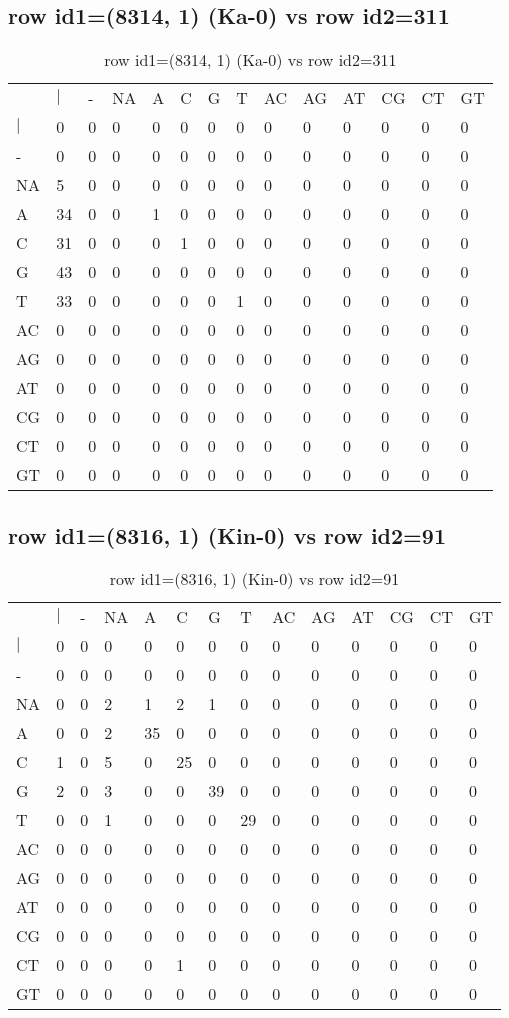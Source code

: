 \subsection{row id1=(8314, 1) (Ka-0) vs row id2=311}
\begin{center}
\begin{longtable}{|l|l|l|l|l|l|l|l|l|l|l|l|l|l|}
\caption{row id1=(8314, 1) (Ka-0) vs row id2=311} \label{table_dm498}\\
\hline
\\
\hline
&$|$&-&NA&A&C&G&T&AC&AG&AT&CG&CT&GT\\
$|$&0&0&0&0&0&0&0&0&0&0&0&0&0\\
-&0&0&0&0&0&0&0&0&0&0&0&0&0\\
NA&5&0&0&0&0&0&0&0&0&0&0&0&0\\
A&34&0&0&1&0&0&0&0&0&0&0&0&0\\
C&31&0&0&0&1&0&0&0&0&0&0&0&0\\
G&43&0&0&0&0&0&0&0&0&0&0&0&0\\
T&33&0&0&0&0&0&1&0&0&0&0&0&0\\
AC&0&0&0&0&0&0&0&0&0&0&0&0&0\\
AG&0&0&0&0&0&0&0&0&0&0&0&0&0\\
AT&0&0&0&0&0&0&0&0&0&0&0&0&0\\
CG&0&0&0&0&0&0&0&0&0&0&0&0&0\\
CT&0&0&0&0&0&0&0&0&0&0&0&0&0\\
GT&0&0&0&0&0&0&0&0&0&0&0&0&0\\
\hline
\end{longtable}
\end{center}

\subsection{row id1=(8316, 1) (Kin-0) vs row id2=91}
\begin{center}
\begin{longtable}{|l|l|l|l|l|l|l|l|l|l|l|l|l|l|}
\caption{row id1=(8316, 1) (Kin-0) vs row id2=91} \label{table_dm500}\\
\hline
\\
\hline
&$|$&-&NA&A&C&G&T&AC&AG&AT&CG&CT&GT\\
$|$&0&0&0&0&0&0&0&0&0&0&0&0&0\\
-&0&0&0&0&0&0&0&0&0&0&0&0&0\\
NA&0&0&2&1&2&1&0&0&0&0&0&0&0\\
A&0&0&2&35&0&0&0&0&0&0&0&0&0\\
C&1&0&5&0&25&0&0&0&0&0&0&0&0\\
G&2&0&3&0&0&39&0&0&0&0&0&0&0\\
T&0&0&1&0&0&0&29&0&0&0&0&0&0\\
AC&0&0&0&0&0&0&0&0&0&0&0&0&0\\
AG&0&0&0&0&0&0&0&0&0&0&0&0&0\\
AT&0&0&0&0&0&0&0&0&0&0&0&0&0\\
CG&0&0&0&0&0&0&0&0&0&0&0&0&0\\
CT&0&0&0&0&1&0&0&0&0&0&0&0&0\\
GT&0&0&0&0&0&0&0&0&0&0&0&0&0\\
\hline
\end{longtable}
\end{center}

